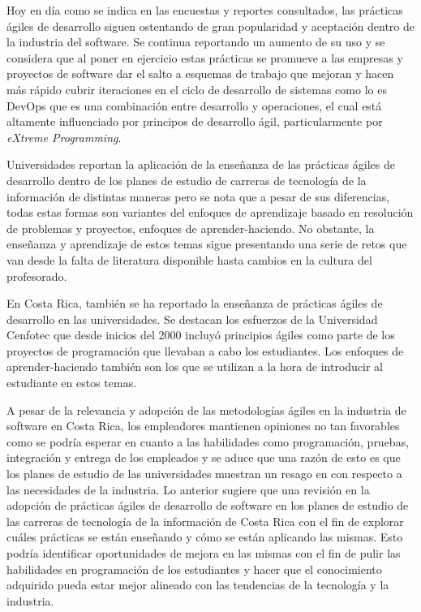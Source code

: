 \documentclass[journal]{IEEEtran}
\begin{document}
Hoy en día como se indica en las encuestas y reportes consultados, las prácticas ágiles de desarrollo siguen ostentando de gran popularidad y aceptación dentro de la industria del software. Se continua reportando un aumento de su uso y se considera que al poner en ejercicio estas prácticas se promueve a las empresas y proyectos de software dar el salto a esquemas de trabajo que mejoran y hacen más rápido cubrir iteraciones en el ciclo de desarrollo de sistemas como lo es DevOps que es una combinación entre desarrollo y operaciones, el cual está altamente influenciado por principos de desarrollo ágil, particularmente por \emph{eXtreme Programming}.

Universidades reportan la aplicación de la enseñanza de las prácticas ágiles de desarrollo dentro de los planes de estudio de carreras de tecnología de la información de distintas maneras pero se nota que a pesar de sus diferencias, todas estas formas son variantes del enfoques de aprendizaje basado en resolución de problemas y proyectos, enfoques de aprender-haciendo. No obstante, la enseñanza y aprendizaje de estos temas sigue presentando una serie de retos que van desde la falta de literatura disponible hasta cambios en la cultura del profesorado.

En Costa Rica, también se ha reportado la enseñanza de prácticas ágiles de desarrollo en las universidades. Se destacan los esfuerzos de la Universidad Cenfotec que desde inicios del 2000 incluyó principios ágiles como parte de los proyectos de programación que llevaban a cabo los estudiantes. Los enfoques de aprender-haciendo también son los que se utilizan a la hora de introducir al estudiante en estos temas. 

A pesar de la relevancia y adopción de las metodologías ágiles en la industria de software en Costa Rica, los empleadores mantienen opiniones no tan favorables como se podría esperar en cuanto a las habilidades como programación, pruebas, integración y entrega de los empleados y se aduce que una razón de esto es que los planes de estudio de las universidades muestran un resago en con respecto a las necesidades de la industria. Lo anterior sugiere que una revisión en la adopción de prácticas ágiles de desarrollo de software en los planes de estudio de las carreras de tecnología de la información de Costa Rica con el fin de explorar cuáles prácticas se están enseñando y cómo se están aplicando las mismas. Esto podría identificar oportunidades de mejora en las mismas con el fin de pulir las habilidades en programación de los estudiantes y hacer que el conocimiento adquirido pueda estar mejor alineado con las tendencias de la tecnología y la industria.
\end{document}
